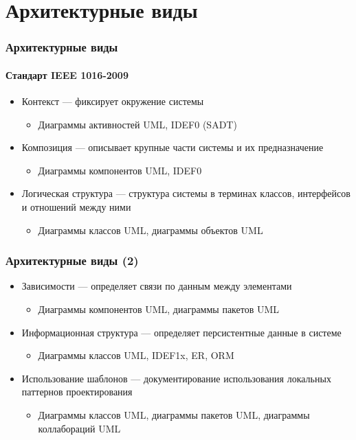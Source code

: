 \documentclass[xetex,mathserif,serif]{beamer}
\begin{document}
	\section{Архитектурные виды}

	\begin{frame}
		\frametitle{Архитектурные виды}
		\framesubtitle{Стандарт IEEE 1016-2009}
		\begin{itemize}
			\item Контекст --- фиксирует окружение системы
			\begin{itemize}
				\item Диаграммы активностей UML, IDEF0 (SADT)
			\end{itemize}
			\item Композиция --- описывает крупные части системы и их предназначение
			\begin{itemize}
				\item Диаграммы компонентов UML, IDEF0
			\end{itemize}
			\item Логическая структура --- структура системы в терминах классов, интерфейсов и отношений между ними
			\begin{itemize}
				\item Диаграммы классов UML, диаграммы объектов UML
			\end{itemize}
		\end{itemize}
	\end{frame}

	\begin{frame}
		\frametitle{Архитектурные виды (2)}
		\begin{itemize}
			\item Зависимости --- определяет связи по данным между элементами
			\begin{itemize}
				\item Диаграммы компонентов UML, диаграммы пакетов UML
			\end{itemize}
			\item Информационная структура --- определяет персистентные данные в системе
			\begin{itemize}
				\item Диаграммы классов UML, IDEF1x, ER, ORM
			\end{itemize}
			\item Использование шаблонов --- документирование использования локальных паттернов проектирования
			\begin{itemize}
				\item Диаграммы классов UML, диаграммы пакетов UML, диаграммы коллабораций UML
			\end{itemize}
		\end{itemize}
	\end{frame}
\end{document}
